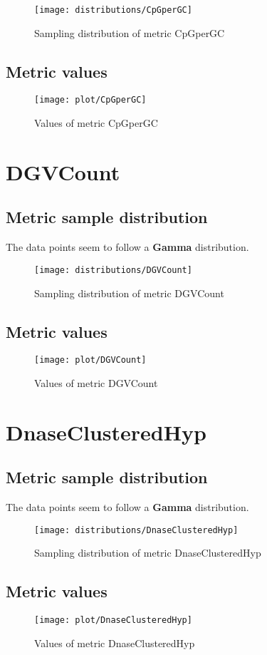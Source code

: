 \documentclass[\main/main.tex]{subfiles}
\begin{document}
\begin{figure}
  \texttt{[image: distributions/CpGperGC]}
  \caption{Sampling distribution of metric CpGperGC}
\end{figure}
\subsection{Metric values}
\begin{figure}
  \texttt{[image: plot/CpGperGC]}
  \caption{Values of metric CpGperGC}
\end{figure}

\clearpage
\section{DGVCount}
\subsection{Metric sample distribution}
The data points seem to follow a \textbf{Gamma} distribution.

\begin{figure}
  \texttt{[image: distributions/DGVCount]}
  \caption{Sampling distribution of metric DGVCount}
\end{figure}
\subsection{Metric values}
\begin{figure}
  \texttt{[image: plot/DGVCount]}
  \caption{Values of metric DGVCount}
\end{figure}

\clearpage
\section{DnaseClusteredHyp}
\subsection{Metric sample distribution}
The data points seem to follow a \textbf{Gamma} distribution.

\begin{figure}
  \texttt{[image: distributions/DnaseClusteredHyp]}
  \caption{Sampling distribution of metric DnaseClusteredHyp}
\end{figure}
\subsection{Metric values}
\begin{figure}
  \texttt{[image: plot/DnaseClusteredHyp]}
  \caption{Values of metric DnaseClusteredHyp}
\end{figure}
\end{document}

